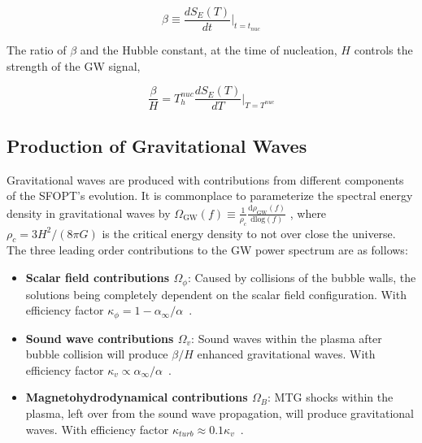 \documentclass[nofootinbib,twocolumn,preprintnumbers]{revtex4-1}
\begin{document}
\begin{equation}
\beta  \equiv \frac{dS_{E}(T)}{dt}\bigg|_{t = t_{nuc}}
\end{equation}

The ratio of $\beta$ and the Hubble constant, at the time of nucleation, $H$ controls the strength of the GW signal,

\begin{equation}
\frac{\beta}{H} = T^{nuc}_h \frac{dS_{E}(T)}{dT}\bigg|_{T = T^{nuc}}
\end{equation}



\subsection{Production of Gravitational Waves}
\label{sec:signals}

Gravitational waves are produced with contributions from different components of the SFOPT's evolution.  It is commonplace to parameterize the spectral energy density in gravitational waves   by $\Omega_{\textrm{GW}} (f) \equiv \frac{1}{ \rho_{c}} \frac{\textrm{d} \rho_{\textrm{GW}}(f) }{\textrm{dlog}(f)}$ \citep{PhysRevD.75.043507}, where $\rho_{c} = 3H^2/(8 \pi G)$ is the critical energy density to not over close the universe. The three leading order contributions to the GW power spectrum are as follows:
\begin{itemize}
\item \textbf{Scalar field contributions $\Omega_{\phi}$}: Caused by collisions of the bubble walls, the solutions being completely dependent on the scalar field configuration. With efficiency factor $\kappa_{\phi} = 1 - \alpha_{\infty}/\alpha$~\citep{PhysRevD.45.4514}. 
\item \textbf{Sound wave contributions $\Omega_{v}$}: Sound waves within the plasma after bubble collision will produce $\beta/H$ enhanced gravitational waves. With efficiency factor $\kappa_{v} \propto \alpha_{\infty}/\alpha$~\citep{PhysRevLett.112.041301}.
\item \textbf{Magnetohydrodynamical contributions $\Omega_{B}$}: MTG shocks within the plasma, left over from the sound wave propagation, will produce gravitational waves. With efficiency factor $\kappa_{
turb} \approx 0.1 \kappa_{v} $~\citep{PhysRevD.74.063521}.
\end{itemize}
\end{document}
